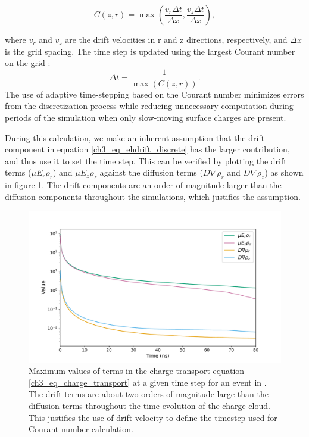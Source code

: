 \begin{equation}
C(z,r) = \max \left( \frac{v_r \Delta t}{\Delta x}, \frac{v_z \Delta t}{\Delta x} \right),
\end{equation}

\noindent
where $v_r$ and $v_z$ are the drift velocities in r and z directions, respectively, and  $\Delta x$ is the grid spacing. The time step is updated using the largest Courant number on the grid :
\begin{equation}
\Delta t = \frac{1}{\max (C(z,r))}.
\end{equation}
The use of adaptive time-stepping based on the Courant number minimizes errors from the discretization process while reducing unnecessary computation during periods of the simulation when only slow-moving surface charges are present.

During this calculation, we make an inherent assumption that the drift component in equation \ref{ch3_eq_ehdrift_discrete} has the larger contribution, and thus use it to set the time step. This can be verified by plotting the drift terms ($\mu E_r \rho_r$) and $\mu E_z \rho_z$ against the diffusion terms ($D \nabla \rho_r$ and $D \nabla \rho_z$) as shown in figure \ref{ch3_fig_ehd_pde_comp}. The drift components are an order of magnitude larger than the diffusion components throughout the simulations, which justifies the assumption.


\begin{figure}%
    \includegraphics[trim={0cm 0 0cm 0},clip,width=0.99\linewidth]{ch3/figs/ehd_pde_comps.pdf}
    \caption{Maximum values of terms in the charge transport equation \ref{ch3_eq_charge_transport} at a given time step for an event in {\ehd}. The drift terms are about two orders of magnitude large than the diffusion terms throughout the time evolution of the charge cloud. This justifies the use of drift velocity to define the timestep used for Courant number calculation.}    
    \label{ch3_fig_ehd_pde_comp}
\end{figure}


